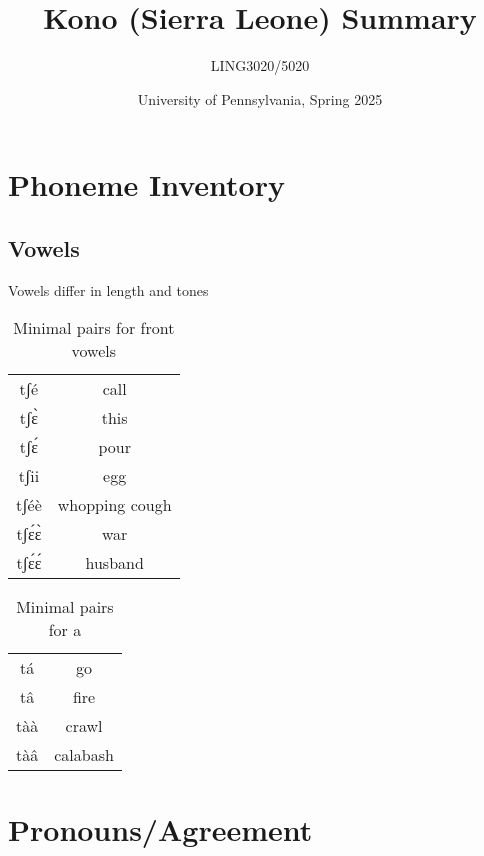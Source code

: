 \documentclass[12pt]{assets/fieldnotes}
\title{Kono (Sierra Leone) Summary}
\author{LING3020/5020}
\date{University of Pennsylvania, Spring 2025}
\begin{document}
\maketitle

\section{Phoneme Inventory}

\subsection{Vowels}
\begin{center}
{\Large
\begin{vowel}
\end{vowel}
}
\end{center}

Vowels differ in length and tones

\begin{table}[htb!]
    \centering
    \begin{tabular}{c|c}
        tʃé & call \\
        tʃɛ̀ & this \\
        tʃɛ́ & pour \\
        tʃii & egg \\
        tʃéè & whopping cough \\
        tʃɛ́ɛ̀ & war \\
        tʃɛ́ɛ́ & husband \\
    \end{tabular}
    \caption{Minimal pairs for front vowels}
    \label{tab:my_label}
\end{table}

\begin{table}[]
    \centering
    \begin{tabular}{c|c}
        tá & go \\
        tâ & fire \\
        tàà & crawl \\
        tàâ & calabash \\
    \end{tabular}
    \caption{Minimal pairs for a}
    \label{tab:my_label}
\end{table}
    
\newpage 
\section{Pronouns/Agreement}
\end{document}
